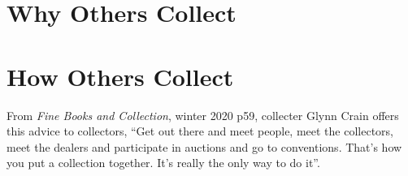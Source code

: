\documentclass[letterpaper]{article}
\begin{document}
\section{Why Others Collect}

\section{How Others Collect}

From {\itshape Fine Books and Collection}, winter 2020 p59, collecter
Glynn Crain offers this advice to collectors, ``Get out there and meet
people, meet the collectors, meet the dealers and participate in
auctions and go to conventions. That's how you put a collection
together. It's really the only way to do it''.
\end{document}
